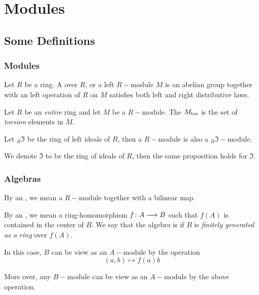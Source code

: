 \chapter{Modules}
\section{Some Definitions}
\subsection{Modules}
  \begin{defn}
    Let $R$ be a ring. A  over $R$, or a left $R-$module $M$ is an abelian group together with an left operation of $R$ on $M$ satisfies both left and right distributive laws.
  \end{defn}

  \begin{defn}
    Let $R$ be an \emph{entire} ring and let $M$ be a $R-$module. The  $M_{\operatorname{tor}}$ is the set of \emph{torsion} elements in $M$.
  \end{defn}


  \begin{prop}
    Let $_R\mathfrak{I}$ be the ring of left ideals of $R$, then a $R-$module is also a $_R\mathfrak{I}-$module.
  \end{prop}
  \begin{rem}
    We denote $\mathfrak{I}$ to be the ring of ideals of $R$, then the same proposition holds for $\mathfrak{I}$.
  \end{rem}

\subsection{Algebras}
  \begin{defn}
    By an , we mean a $R-$module together with a bilinear map.
  \end{defn}

  \begin{defn}
    By an , we mean a ring-homomorphism $f\colon A\longrightarrow B$ such that $f(A)$ is contained in the center of $B$. We say that the algebra is  if $B$ is \emph{finitely generated as a ring} over $f(A)$.
  \end{defn}
  \begin{rem}
    In this case, $B$ can be view as an $A-$module by the operation
    \begin{equation*}
      (a,b)\longmapsto f(a)b
    \end{equation*}

    More over, any $B-$module can be view as an $A-$module by the above operation.
  \end{rem}

